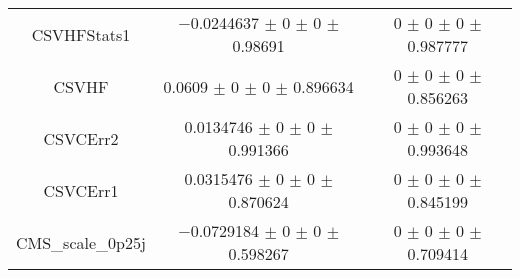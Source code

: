 \begin{table}
\begin{tabular}{ccc}
CSVHFStats1 	& \num{-0.0244637} $\pm$ \num{0} $\pm$ \num{0} $\pm$ \num{0.98691} 	& \num{0} $\pm$ \num{0} $\pm$ \num{0} $\pm$ \num{0.987777}\\
CSVHF 	& \num{0.0609} $\pm$ \num{0} $\pm$ \num{0} $\pm$ \num{0.896634} 	& \num{0} $\pm$ \num{0} $\pm$ \num{0} $\pm$ \num{0.856263}\\
CSVCErr2 	& \num{0.0134746} $\pm$ \num{0} $\pm$ \num{0} $\pm$ \num{0.991366} 	& \num{0} $\pm$ \num{0} $\pm$ \num{0} $\pm$ \num{0.993648}\\
CSVCErr1 	& \num{0.0315476} $\pm$ \num{0} $\pm$ \num{0} $\pm$ \num{0.870624} 	& \num{0} $\pm$ \num{0} $\pm$ \num{0} $\pm$ \num{0.845199}\\
CMS\_scale\_0p25j 	& \num{-0.0729184} $\pm$ \num{0} $\pm$ \num{0} $\pm$ \num{0.598267} 	& \num{0} $\pm$ \num{0} $\pm$ \num{0} $\pm$ \num{0.709414}\\
\bottomrule
\end{tabular}
\end{table}